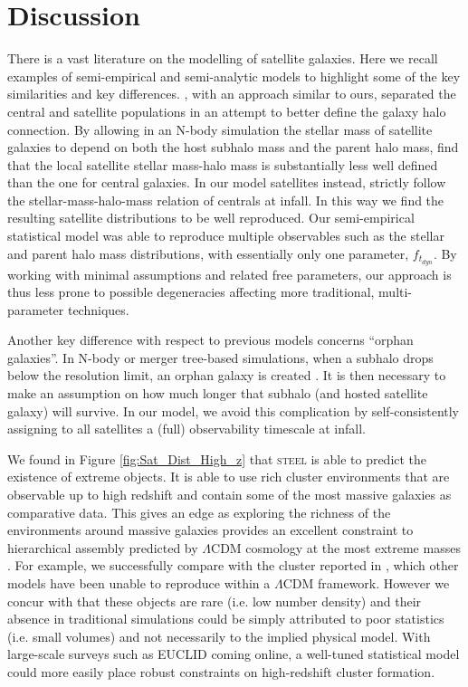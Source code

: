 \section{Discussion}

There is a vast literature on the modelling of satellite galaxies. Here we recall examples of semi-empirical and semi-analytic models to highlight some of the key similarities and key differences. \citet{Neistein2013A2011}, with an approach similar to ours, separated the central and satellite populations in an attempt to better define the galaxy halo connection. By allowing in an N-body simulation the stellar mass of satellite galaxies to depend on both the host subhalo mass and the parent halo mass, \citet{Neistein2013A2011} find that the local satellite stellar mass-halo mass is substantially less well defined than the one for central galaxies. In our model satellites instead, strictly follow the stellar-mass-halo-mass relation of centrals at infall. In this way we find the resulting satellite distributions to be well reproduced. Our semi-empirical statistical model was able to reproduce multiple observables such as the stellar and parent halo mass distributions, with essentially only one parameter, $f_{t_{dyn}}$. By working with minimal assumptions and related free parameters, our approach is thus less prone to possible degeneracies affecting more traditional, multi-parameter techniques.

Another key difference with respect to previous models concerns ``orphan galaxies''. In N-body or merger tree-based simulations, when a subhalo drops below the resolution limit, an orphan galaxy is created \citep[e.g.,][]{Guo2011FromCosmology, DeLucia2011TimesCosmology}. It is then necessary to make an assumption on how much longer that subhalo (and hosted satellite galaxy) will survive. In our model, we avoid this complication by self-consistently assigning to all satellites a (full) observability timescale at infall.

We found in Figure \ref{fig:Sat_Dist_High_z} that \textsc{steel} is able to predict the existence of extreme objects. It is able to use rich cluster environments that are observable up to high redshift and contain some of the most massive galaxies as comparative data. This gives \steel an edge as exploring the richness of the environments around massive galaxies provides an excellent constraint to hierarchical assembly predicted by $\Lambda$CDM cosmology at the most extreme masses \citep{Shankar2015}. For example, we successfully compare with the cluster reported in \citet{Wang2016DISCOVERY2.506}, which other models \cite[e.g.][]{Henriques2015GalaxyMasses} have been unable to reproduce within a $\Lambda$CDM framework. However we concur with \citet{Wang2016DISCOVERY2.506} that these objects are rare (i.e. low number density) and their absence in traditional simulations could be simply attributed to poor statistics (i.e. small volumes) and not necessarily to the implied physical model. With large-scale surveys such as EUCLID coming online, a well-tuned statistical model could more easily place robust constraints on high-redshift cluster formation. 
 
